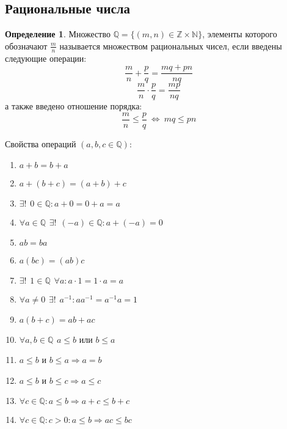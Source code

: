 \documentclass[a4paper, 12pt]{article}
\newcommand{\Z}{\mathbb{Z}}
\newcommand{\N}{\mathbb{N}}
\newcommand{\Q}{\mathbb{Q}}
\theoremstyle{definition}
\newtheorem*{definition}{Определение}
\begin{document}
    \subsection{Рациональные числа}
        \begin{definition}
            Множество $\Q=\{(m,n)\in \Z \times \N\}$, элементы которого обозначают $\frac{m}{n}$ называется множеством рациональных чисел, если введены следующие операции:
            \[\frac{m}{n}+\frac{p}{q}=\frac{mq+pn}{nq}\]
            \[\frac{m}{n}\cdot \frac{p}{q}=\frac{mp}{nq}\]
            а также введено отношение порядка:
            \[\frac{m}{n}\leq \frac{p}{q}\ \Leftrightarrow\ mq\leq pn\]
        \end{definition}
        Свойства операций $(a,b,c \in \Q)$:
        \begin{enumerate}
            \item $a+b=b+a$
            \item $a+(b+c)=(a+b)+c$
            \item $\exists ! \hspace{5pt} 0 \in \Q: a+0=0+a=a$
            \item $\forall a\in \Q \hspace{5pt} \exists ! \hspace{5pt} (-a)\in \Q: a+(-a)=0$
            \item $ab=ba$
            \item $a(bc)=(ab)c$
            \item $\exists ! \hspace{5pt} 1\in \Q \hspace{5pt} \forall a: a\cdot 1=1\cdot a=a$
            \item $\forall a\ne 0 \hspace{5pt} \exists ! \hspace{5pt} a^{-1}: aa^{-1}=a^{-1}a=1$
            \item $a(b+c)=ab+ac$
            \item $\forall a,b\in \Q \hspace{5pt} a\leq b$ или $b\leq a$
            \item $a\leq b$ и $b\leq a \Rightarrow a=b$
            \item $a\leq b$ и $b\leq c \Rightarrow a\leq c$
            \item $\forall c \in \Q: a\leq b \Rightarrow a+c\leq b+c$
            \item $\forall c\in \Q: c>0: a\leq b\Rightarrow ac\leq bc$
        \end{enumerate}
\end{document}
